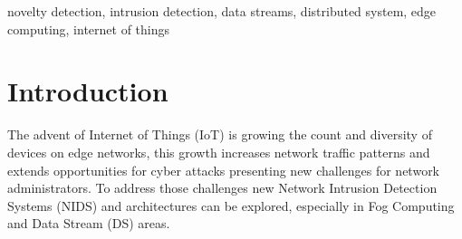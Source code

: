 \documentclass[conference]{IEEEtran}
\begin{document}
\begin{IEEEkeywords}
novelty detection, intrusion detection, data streams, distributed system, edge computing, internet of things
\end{IEEEkeywords}

\section{Introduction}


\newcommand{\refminas}{\textit{Ref}\xspace}
\newcommand{\mfog}{\textit{MFOG}\xspace}
\newcommand{\iot}{IoT\xspace}

The advent of Internet of Things (\iot) is growing the count and diversity of
devices on edge networks, this growth increases network traffic patterns and
extends opportunities for cyber attacks presenting new challenges for network
administrators.
To address those challenges new Network Intrusion Detection Systems (NIDS) and
architectures can be explored, especially in Fog Computing and Data Stream (DS)
areas.
\end{document}
